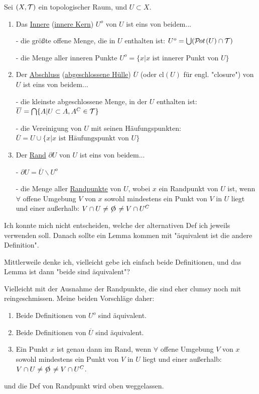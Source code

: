 \begin{definition}
    Sei $(X, \mathcal{T})$ ein topologischer Raum, und $U \subset X$.
    \begin{enumerate}
        \item Das \underline{Innere} (\underline{innere Kern}) $U^o$ von $U$ ist eins von beidem...

        - die größte offene Menge, die in $U$ enthalten ist: $U^o = \bigcup (\mathcal{P}\hspace{-1pt}ot\hspace{1pt}(U) \cap \mathcal{T})$

        - die Menge aller inneren Punkte $U^o = \{x | x \text{ ist innerer Punkt von } U\}$
        \item Der \underline{Abschluss} (\underline{abgeschlossene Hülle}) $\overline{U}$ (oder $\text{cl}(U)$ für engl. "closure") von $U$ ist eins von beidem...

        - die kleinste abgeschlossene Menge, in der $U$ enthalten ist: $\overline{U} = \bigcap \{ A | U \subset A, A^C \in \mathcal{T} \}$

        - die Vereinigung von $U$ mit seinen Häufungspunkten: $\overline{U} = U \cup \{x | x \text{ ist Häufungspunkt von } U\}$
        \item Der \underline{Rand} $\partial U$ von $U$ ist eins von beidem...

        - $\partial U = \overline{U} \backslash U^o$

        - die Menge aller \underline{Randpunkte} von $U$, wobei $x$ ein Randpunkt von $U$ ist, wenn $\forall$ offene Umgebung $V$ von $x$ sowohl mindestens ein Punkt von $V$ in $U$ liegt und einer außerhalb: $V \cap U \neq \e \neq V \cap U^C$
    \end{enumerate}
\end{definition}

\begin{query}
    Ich konnte mich nicht entscheiden, welche der alternativen Def ich jeweils verwenden soll. Danach sollte ein Lemma kommen mit "äquivalent ist die andere Definition".
    
    Mittlerweile denke ich, vielleicht gebe ich einfach beide Definitionen, und das Lemma ist dann "beide sind äquivalent"?

    Vielleicht mit der Ausnahme der Randpunkte, die sind eher clumsy noch mit reingeschmissen. Meine beiden Vorschläge daher:
\end{query}

\begin{lemma}
    \begin{enumerate}
        \item Beide Definitionen von $U^o$ sind äquivalent.
        \item Beide Definitionen von $\overline{U}$ sind äquivalent.
        \item Ein Punkt $x$ ist genau dann im Rand, wenn $\forall$ offene Umgebung $V$ von $x$ sowohl mindestens ein Punkt von $V$ in $U$ liegt und einer außerhalb: $V \cap U \neq \e \neq V \cap U^C$.
    \end{enumerate}
    und die Def von Randpunkt wird oben weggelassen.
\end{lemma}

